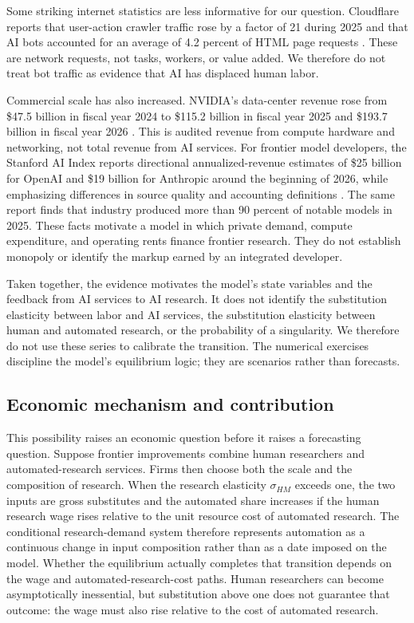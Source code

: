 Some striking internet statistics are less informative for our question. Cloudflare
reports that user-action crawler traffic rose by a factor of 21 during 2025 and that
AI bots accounted for an average of 4.2 percent of HTML page requests
\citep{cloudflareradar2025}. These are network requests, not tasks, workers, or value
added. We therefore do not treat bot traffic as evidence that AI has displaced human
labor.

Commercial scale has also increased. NVIDIA's data-center revenue rose from \$47.5
billion in fiscal year 2024 to \$115.2 billion in fiscal year 2025 and \$193.7
billion in fiscal year 2026 \citep{nvidia2026}. This is audited revenue from compute
hardware and networking, not total revenue from AI services. For frontier model
developers, the Stanford AI Index reports directional annualized-revenue estimates
of \$25 billion for OpenAI and \$19 billion for Anthropic around the beginning of
2026, while emphasizing differences in source quality and accounting definitions
\citep{stanfordaiindex2026}. The same report finds that industry produced more than
90 percent of notable models in 2025. These facts motivate a model in which private
demand, compute expenditure, and operating rents finance frontier research. They do
not establish monopoly or identify the markup earned by an integrated developer.

Taken together, the evidence motivates the model's state variables and the feedback
from AI services to AI research. It does not identify the substitution elasticity
between labor and AI services, the substitution elasticity between human and
automated research, or the probability of a singularity. We therefore do not use
these series to calibrate the transition. The numerical exercises discipline the
model's equilibrium logic; they are scenarios rather than forecasts.

\subsection{Economic mechanism and contribution}

This possibility raises an economic question before it raises a forecasting question.
Suppose frontier improvements combine human researchers and automated-research
services. Firms then choose both the scale and the composition of research. When the
research elasticity $\sigma_{HM}$ exceeds one, the two inputs are gross substitutes and
the automated share increases if the human research wage rises relative to the unit
resource cost of automated research. The conditional research-demand system
therefore represents automation as a continuous change in input composition rather
than as a date imposed on the model. Whether the equilibrium actually completes that
transition depends on the wage and automated-research-cost paths. Human researchers
can become asymptotically inessential, but substitution above one does not guarantee
that outcome: the wage must also rise relative to the cost of automated research.

